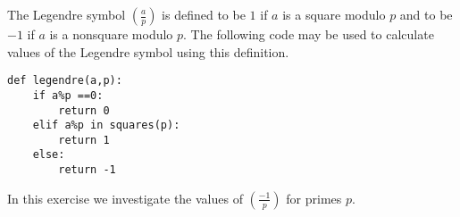 \documentclass[12pt]{exam}
\begin{document}
\begin{questions}
  \newpage
  \question The Legendre symbol $(\frac ap)$ is defined to be $1$ if $a$ is a square modulo $p$ and to be $-1$ if $a$ is a nonsquare modulo $p$. The following code may be used to calculate values of the Legendre symbol using this definition.
  \begin{lstlisting}
def legendre(a,p):
    if a%p ==0:
        return 0
    elif a%p in squares(p):
        return 1
    else:
        return -1
  \end{lstlisting}
  In this exercise we investigate the values of $(\frac {-1}{p})$ for primes $p$.
\end{questions}
\end{document}
